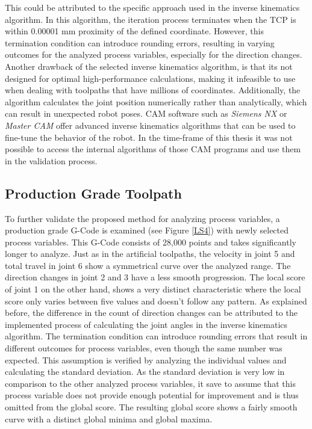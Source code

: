 This could be attributed to the specific approach used in the inverse kinematics algorithm. In this algorithm, the iteration process terminates when the \acrshort{TCP} is within 0.00001 mm proximity of the defined coordinate. However, this termination condition can introduce rounding errors, resulting in varying outcomes for the analyzed process variables, especially for the direction changes. Another drawback of the selected inverse kinematics algorithm, is that its not designed for optimal high-performance calculations, making it infeasible to use when dealing with toolpaths that have millions of coordinates. Additionally, the algorithm calculates the joint position numerically rather than analytically, which can result in unexpected robot poses. \acrshort{CAM} software such as \textit{Siemens NX} or \textit{Master CAM} offer advanced inverse kinematics algorithms that can be used to fine-tune the behavior of the robot. In the time-frame of this thesis it was not possible to access the internal algorithms of those \acrshort{CAM} programs and use them in the validation process.
\newpage



\subsection{Production Grade Toolpath}
To further validate the proposed method for analyzing process variables, a production grade G-Code is examined (see Figure \ref{LS4}) with newly selected process variables. This G-Code consists of 28,000 points and takes significantly longer to analyze. Just as in the artificial toolpaths, the velocity in joint 5 and total travel in joint 6 show a symmetrical curve over the analyzed range. The direction changes in joint 2 and 3 have a less smooth progression. The local score of joint 1 on the other hand, shows a very distinct characteristic where the local score only varies between five values and doesn't follow any pattern.  
As explained before, the difference in the count of direction changes can be attributed to the implemented process of calculating the joint angles in the inverse kinematics algorithm. The termination condition can introduce rounding errors that result in different outcomes for process variables, even though the same number was expected. This assumption is verified by analyzing the individual values and calculating the standard deviation. As the standard deviation is very low in comparison to the other analyzed process variables, it save to assume that this process variable does not provide enough potential for improvement and is thus omitted from the global score. The resulting global score shows a fairly smooth curve with a distinct global minima and global maxima. 

